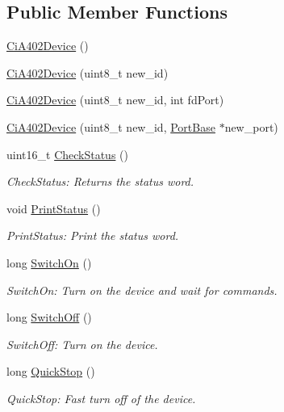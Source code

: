 \subsection*{Public Member Functions}
\begin{DoxyCompactItemize}
\item 
\hyperlink{classCiA402Device_a894ef30b3c5a0ed291b086ad2156e4c1}{Ci\+A402\+Device} ()
\item 
\hyperlink{classCiA402Device_a77998e6d9ac4b75764612f3cab7426ef}{Ci\+A402\+Device} (uint8\+\_\+t new\+\_\+id)
\item 
\hyperlink{classCiA402Device_a084b18ac995775f5079c8b260ec4c6c8}{Ci\+A402\+Device} (uint8\+\_\+t new\+\_\+id, int fd\+Port)
\item 
\hyperlink{classCiA402Device_a017bcbc5d6e7a87b950b3cf2fcff1c41}{Ci\+A402\+Device} (uint8\+\_\+t new\+\_\+id, \hyperlink{classPortBase}{Port\+Base} $\ast$new\+\_\+port)
\item 
uint16\+\_\+t \hyperlink{classCiA402Device_a5a034b00c87d2ec9ec98157b772465d9}{Check\+Status} ()
\begin{DoxyCompactList}\small\item\em Check\+Status\+: Returns the status word. \end{DoxyCompactList}\item 
void \hyperlink{classCiA402Device_a9d5d8df28085395a3ab711107a181ebc}{Print\+Status} ()
\begin{DoxyCompactList}\small\item\em Print\+Status\+: Print the status word. \end{DoxyCompactList}\item 
long \hyperlink{classCiA402Device_ab77bce0d7f42429f5f8f092aacb02754}{Switch\+On} ()
\begin{DoxyCompactList}\small\item\em Switch\+On\+: Turn on the device and wait for commands. \end{DoxyCompactList}\item 
long \hyperlink{classCiA402Device_a97acf47b3e3751c85fa70091d3bdfa6a}{Switch\+Off} ()
\begin{DoxyCompactList}\small\item\em Switch\+Off\+: Turn on the device. \end{DoxyCompactList}\item 
long \hyperlink{classCiA402Device_a8573afbf420c29aa86cd215d74f4e4e3}{Quick\+Stop} ()
\begin{DoxyCompactList}\small\item\em Quick\+Stop\+: Fast turn off of the device. \end{DoxyCompactList}\item 

\end{DoxyCompactItemize}
